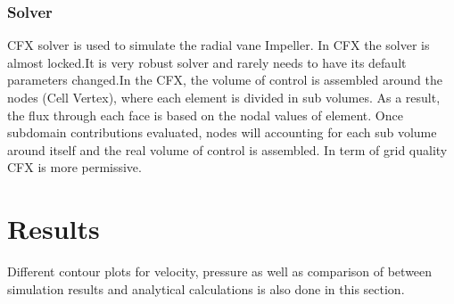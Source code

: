 \documentclass[11pt]{article}
\begin{document}
 \subsubsection{Solver}
 CFX solver is used to simulate the radial vane Impeller. In CFX the solver is almost locked.It is very robust solver and rarely needs to have its default parameters changed.In the CFX, the volume of control is assembled around the nodes (Cell Vertex), where each element is divided in sub volumes. As a result, the flux through each face is based on the nodal values of element. Once subdomain contributions evaluated, nodes will accounting for each sub volume around itself and the real volume of control is assembled. In term of grid quality CFX is more permissive.\\
 \section{Results}
 Different contour plots for velocity, pressure as well as comparison of between simulation results and analytical calculations is also done in this section.
\end{document}
